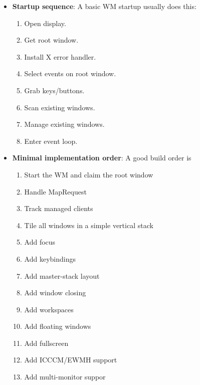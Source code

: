 \documentclass{report}
\begin{document}
    \pagebreak 
    \begin{itemize}
        \item \textbf{Startup sequence}: A basic WM startup usually does this:
            \begin{enumerate}
                \item Open display.
                \item Get root window.
                \item Install X error handler.
                \item Select events on root window.
                \item Grab keys/buttons.
                \item Scan existing windows.
                \item Manage existing windows.
                \item Enter event loop.
            \end{enumerate}
        \item \textbf{Minimal implementation order}: A good build order is 
            \begin{enumerate}
                \item Start the WM and claim the root window
                \item Handle MapRequest
                \item Track managed clients
                \item Tile all windows in a simple vertical stack
                \item Add focus
                \item Add keybindings
                \item Add master-stack layout
                \item Add window closing
                \item Add workspaces
                \item Add floating windows
                \item Add fullscreen
                \item Add ICCCM/EWMH support
                \item Add multi-monitor suppor
            \end{enumerate}
    \end{itemize}
\end{document}
